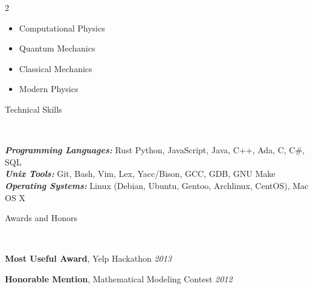 \documentclass[9pt]{article}
\newenvironment{changemargin}[2]{%
  \begin{list}{}{%
    \setlength{\topsep}{0pt}%
    \setlength{\leftmargin}{#1}%
    \setlength{\rightmargin}{#2}%
    \setlength{\listparindent}{\parindent}%
    \setlength{\itemindent}{\parindent}%
    \setlength{\parsep}{\parskip}%
  }%
  \item[]}{\end{list}
}
\newcommand{\lineover}{
    \begin{changemargin}{-0.05in}{-0.05in}
        \vspace*{-8pt}
        \hrulefill \\
        \vspace*{-2pt}
    \end{changemargin}
}
\newcommand{\header}[1]{
    \begin{changemargin}{-0.5in}{-0.5in}
        {\large #1}\\
        \lineover
    \end{changemargin}
}
\newenvironment{body} {
    \vspace*{-16pt}
    \begin{changemargin}{-0.20in}{-0.5in}
  }
    {\end{changemargin}
}
\begin{document}
\begin{body}
\begin{multicols}{2}
\begin{itemize}
            \item [] Computational Physics
            \item [] Quantum Mechanics
            \item [] Classical Mechanics
            \item [] Modern Physics


        \end{itemize}
    \end{multicols}
\end{body}



\header{Technical Skills}
\begin{body}
    \vspace{14pt}
    \emph{\textbf{Programming Languages:}}{} Rust Python, JavaScript, Java, C++, Ada, C, C\#, SQL\\
    \medskip
    \emph{\textbf{Unix Tools:}}{} Git, Bash, Vim, Lex, Yacc/Bison, GCC, GDB, GNU Make\\
    \medskip
    \emph{\textbf{Operating Systems:}}{} Linux (Debian, Ubuntu, Gentoo, Archlinux, CentOS), Mac OS X\\
\end{body}

\smallskip



\header{Awards and Honors}

\begin{body}
    \vspace{14pt}

    \textbf{Most Useful Award}, Yelp Hackathon \hfill{} \emph{2013}\\
    \smallskip

    \textbf{Honorable Mention}, Mathematical Modeling Contest \hfill{} \emph{2012}\\

\end{body}
\smallskip
\end{document}
